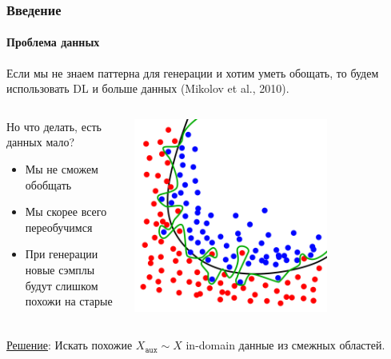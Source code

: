 \documentclass[10pt]{beamer}
\begin{document}
\begin{frame}
\frametitle{Введение}
\framesubtitle{Проблема данных}

Если мы не знаем паттерна для генерации и хотим уметь обощать, то будем использовать DL и больше данных (Mikolov et al., 2010). \\

\begin{columns}
    \begin{column}{0.5\textwidth}
        Но что делать, есть данных мало?
        \begin{itemize}
            \item Мы не сможем обобщать 
            \item Мы скорее всего переобучимся
            \item При генерации новые сэмплы будут слишком похожи на старые
        \end{itemize}
    \end{column}
    \begin{column}{0.5\textwidth}
        \begin{center}
            \includegraphics[width=0.7\textwidth]{images/overfitting.png}
        \end{center}
    \end{column}
\end{columns}

\vskip4mm

\underline{Решение}: Искать похожие $X_{\texttt{aux}} \sim X$ in-domain данные из смежных областей.

\end{frame}
\end{document}
